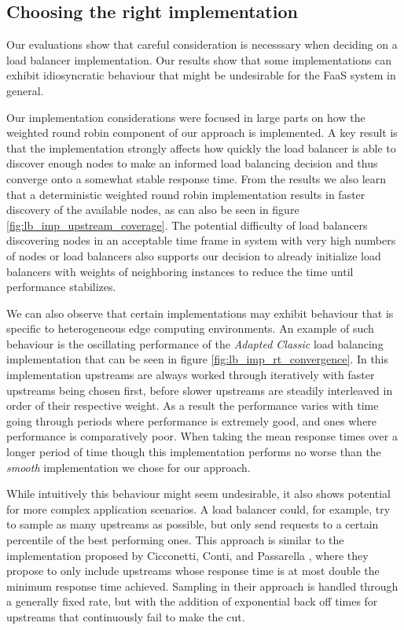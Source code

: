 \documentclass[draft,final]{vutinfth} %
\begin{document}
\subsection{Choosing the right implementation}
Our evaluations show that careful consideration is necesssary when deciding on a load balancer implementation.
Our results show that some implementations can exhibit idiosyncratic behaviour that might be undesirable for the FaaS system in general.

Our implementation considerations were focused in large parts on how the weighted round robin component of our approach is implemented.
A key result is that the implementation strongly affects how quickly the load balancer is able to discover enough nodes to make an informed load balancing decision and thus converge onto a somewhat stable response time.
From the results we also learn that a deterministic weighted round robin implementation results in faster discovery of the available nodes, as can also be seen in figure \ref{fig:lb_imp_upstream_coverage}.
The potential difficulty of load balancers discovering nodes in an acceptable time frame in system with very high numbers of nodes or load balancers also supports our decision to already initialize load balancers with weights of neighboring instances to reduce the time until performance stabilizes.

We can also observe that certain implementations may exhibit behaviour that is specific to heterogeneous edge computing environments.
An example of such behaviour is the oscillating performance of the \textit{Adapted Classic} load balancing implementation that can be seen in figure \ref{fig:lb_imp_rt_convergence}.
In this implementation upstreams are always worked through iteratively with faster upstreams being chosen first, before slower upstreams are steadily interleaved in order of their respective weight.
As a result the performance varies with time going through periods where performance is extremely  good, and ones where performance is comparatively poor.
When taking the mean response times over a longer period of time though this implementation performs no worse than the \textit{smooth} implementation we chose for our approach.

While intuitively this behaviour might seem undesirable, it also shows potential for more complex application scenarios.
A load balancer could, for example, try to sample as many upstreams as possible, but only send requests to a certain percentile of the best performing ones.
This approach is similar to the implementation proposed by Cicconetti, Conti, and Passarella \cite{cicconettiDecentralizedFrameworkServerless2020}, where they propose to only include upstreams whose response time is at most double the minimum response time achieved.
Sampling in their approach is handled through a generally fixed rate, but with the addition of exponential back off times for upstreams that continuously fail to make the cut.
\end{document}
